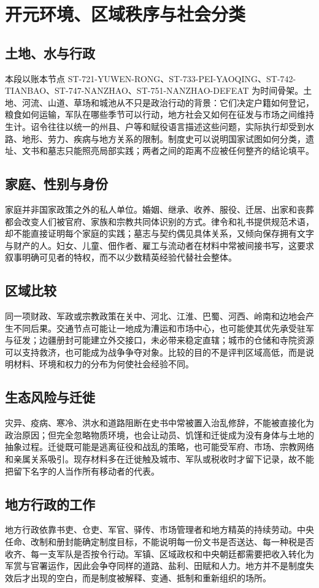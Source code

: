\section{开元环境、区域秩序与社会分类} \label{sec:kaiyuan-environment-regional-order}  \subsection{土地、水与行政} 本段以账本节点 ST-721-YUWEN-RONG、ST-733-PEI-YAOQING、ST-742-TIANBAO、ST-747-NANZHAO、ST-751-NANZHAO-DEFEAT 为时间骨架。土地、河流、山道、草场和城池从不只是政治行动的背景：它们决定户籍如何登记，粮食如何运输，军队在哪些季节可以行动，地方社会又如何在征发与市场之间维持生计。诏令往往以统一的州县、户等和赋役语言描述这些问题，实际执行却受到水路、地形、劳力、疾病与地方关系的限制。制度史可以说明国家试图如何分类，遗址、文书和墓志只能照亮局部实践；两者之间的距离不应被任何整齐的结论填平。  \subsection{家庭、性别与身份} 家庭并非国家政策之外的私人单位。婚姻、继承、收养、服役、迁居、出家和丧葬都会改变人们被官府、家族和宗教共同体识别的方式。律令和礼书提供规范术语，却不能直接证明每个家庭的实践；墓志与契约偶见具体关系，又倾向保存拥有文字与财产的人。妇女、儿童、佃作者、雇工与流动者在材料中常被间接书写，这要求叙事明确可见者的特权，而不以少数精英经验代替社会整体。  \subsection{区域比较} 同一项财政、军政或宗教政策在关中、河北、江淮、巴蜀、河西、岭南和边地会产生不同后果。交通节点可能让一地成为漕运和市场中心，也可能使其优先承受驻军与征发；边疆册封可能建立外交接口，未必带来稳定直辖；城市的仓储和寺院资源可以支持救济，也可能成为战争争夺对象。比较的目的不是评判区域高低，而是说明材料、环境和权力的分布为何使社会经验不同。  \subsection{生态风险与迁徙} 灾异、疫病、寒冷、洪水和道路阻断在史书中常被置入治乱修辞，不能被直接化为政治原因；但完全忽略物质环境，也会让动员、饥馑和迁徙成为没有身体与土地的抽象过程。迁徙既可能是逃离征役和战乱的策略，也可能受军府、市场、宗教网络和亲属关系吸引。现存材料多在迁徙触及城市、军队或税收时才留下记录，故不能把留下名字的人当作所有移动者的代表。  \subsection{地方行政的工作} 地方行政依靠书吏、仓吏、军官、驿传、市场管理者和地方精英的持续劳动。中央任命、改制和册封能确定制度目标，不能说明每一份文书是否送达、每一种税是否收齐、每一支军队是否按令行动。军镇、区域政权和中央朝廷都需要把收入转化为军赏与官署运作，因此会争夺同样的道路、盐利、田赋和人力。地方并不是制度失效后才出现的空白，而是制度被解释、变通、抵制和重新组织的场所。  